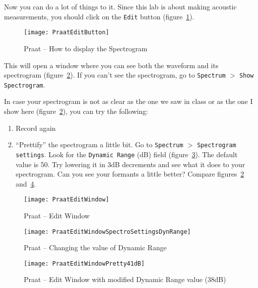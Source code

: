 \documentclass{article}
\newcommand{\soft}[1]{\textsf{#1}}
\newcommand{\softmenu}[1]{\texttt{#1}}
\newcommand{\Praat}{\soft{Praat}}
\begin{document}
Now you can do a lot of things to it. Since this lab is about making acoustic measurements, you should click on the \softmenu{Edit} button (figure~\ref{step2look}).

\begin{figure}[!tbp]
\caption{\Praat{} -- How to display the Spectrogram}
\label{step2look}
	\begin{center}
		\texttt{[image: PraatEditButton]}
	\end{center}
\end{figure}

This will open a window where you can see both the waveform and its spectrogram (figure~\ref{step3look}). If you can't see the spectrogram, go to \softmenu{Spectrum} $>$ \softmenu{Show Spectrogram}.

In case your spectrogram is not as clear as the one we saw in class or as the one I show here (figure~\ref{step3look}), you can try the following:

\begin{enumerate}
\item Record again
\item ``Prettify'' the spectrogram a little bit. Go to \softmenu{Spectrum} $>$ \softmenu{Spectrogram settings}. Look for the \softmenu{Dynamic Range} (dB) field (figure~\ref{step4look}). The default value is 50. Try lowering it in 3dB decrements and see what it does to your spectrogram. Can you see your formants a little better? Compare figures~\ref{step3look} and~\ref{step5look}.
\end{enumerate}


\begin{figure}[!tbp]
\caption{\Praat{} -- Edit Window}
\label{step3look}
	\begin{center}
		\texttt{[image: PraatEditWindow]}
	\end{center}
\end{figure}

\begin{figure}[!tbp]
\caption{\Praat{} -- Changing the value of Dynamic Range}
\label{step4look}
	\begin{center}
		\texttt{[image: PraatEditWindowSpectroSettingsDynRange]}
	\end{center}
\end{figure}

\begin{figure}[!tbp]
\caption{\Praat{} -- Edit Window with modified Dynamic Range value (38dB)}
\label{step5look}
	\begin{center}
		\texttt{[image: PraatEditWindowPretty41dB]}
	\end{center}
\end{figure}
\end{document}
